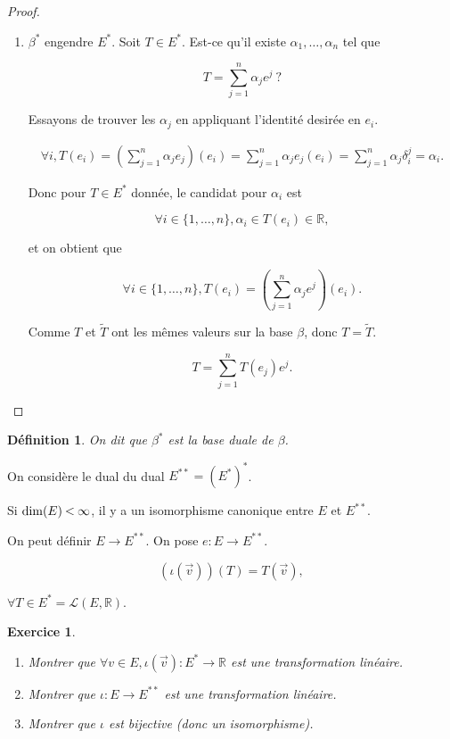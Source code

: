 \documentclass[french]{article}
\newtheorem{definition}{Définition}[section]
\newtheorem{exo}{Exercice}
\newcommand{\lesss}{\rotatebox[origin=c]{90}{$\land$}}
\newcommand{\less}{\ \lesss\ }
\begin{document}
\begin{proof}
\begin{enumerate}
    \item $\beta ^{*}$ engendre $E ^{*}$. Soit $T \in E ^{*}$. Est-ce qu'il existe $\alpha_1,\dots, \alpha_n$ tel que

    \[
    T = \sum_{j=1}^{n} \alpha_j e ^{j} \ ?
    \]

    Essayons de trouver les $\alpha_j$ en appliquant l'identité desirée en $e_i$.

    \begin{gather*}
      \forall i, T(e_i) = \left( \sum_{j=1}^{n} \alpha_j e_j \right)(e_i) = \sum_{j=1}^{n} \alpha_j e_j(e_i) = \sum_{j=1}^{n} \alpha_j \delta_i ^{j} = \alpha_i.
    \end{gather*}

    Donc pour $T \in E ^{*}$ donnée, le candidat pour $\alpha_i$ est

    \[
    \forall i \in \{ 1, \dots, n \}, \alpha_i \in T(e_i) \in \mathbb{R},
    \]

    et on obtient que

    \[
    \forall i \in \{ 1, \dots, n \}, T(e_i) = \left(\sum_{j=1}^{n} \alpha_j e ^{j} \right) (e_i).
    \]

    Comme $T$ et $\tilde{T}$ ont les mêmes valeurs sur la base $\beta $, donc $T = \tilde{T}$.

    \[
    T = \sum_{j=1}^{n} T(e_j) e ^{j}.
    \]

  \end{enumerate}
\end{proof}


\begin{definition}
  On dit que $\beta ^{*}$ est la base duale de $\beta $.
\end{definition}

On considère le dual du dual $E ^{**} = (E ^{*}) ^{*}$.


\begin{thm}
  Si $\operatorname{dim}(E) \less \infty$, il y a un isomorphisme canonique entre $E$ et $E ^{**}$.
\end{thm}

On peut définir $E \to E ^{**}$. On pose $e : E \to E ^{**}$.

\[
(\iota(\overrightarrow{ v } ))(T) = T(\overrightarrow{ v } ),
\]

$\forall T \in E ^{*} = \mathscr{L}(E, \mathbb{R}) $.

\begin{exo}

  \

  \begin{enumerate}
    \item Montrer que $\forall v \in E, \iota(\overrightarrow{ v } ) : E ^{*} \to \mathbb{R}$ est une transformation linéaire.
    \item Montrer que $\iota : E \to E ^{**}$ est une transformation linéaire.
    \item Montrer que $\iota$ est bijective (donc un isomorphisme).
  \end{enumerate}
\end{exo}
\end{document}
